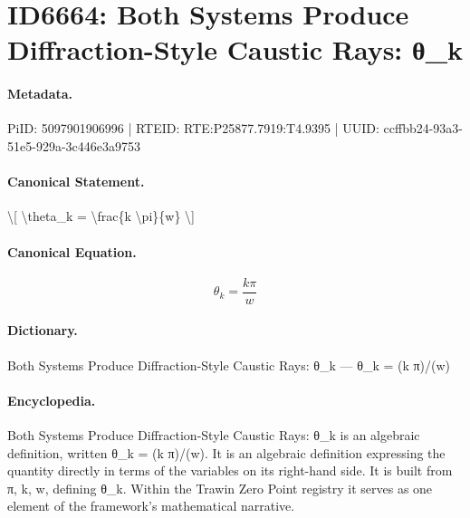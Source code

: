 \section*{ID6664: Both Systems Produce Diffraction-Style Caustic Rays: θ\_k}
\paragraph{Metadata.}
PiID: 5097901906996 | RTEID: RTE:P25877.7919:T4.9395 | UUID: ccffbb24-93a3-51e5-929a-3c446e3a9753

\paragraph{Canonical Statement.}
\textbackslash{}[ \textbackslash{}theta\_k = \textbackslash{}frac\{k \textbackslash{}pi\}\{w\} \textbackslash{}]

\paragraph{Canonical Equation.}
\[
\theta_k = \frac{k \pi}{w}
\]

\paragraph{Dictionary.}
Both Systems Produce Diffraction-Style Caustic Rays: θ\_k — θ\_k = (k π)/(w)

\paragraph{Encyclopedia.}
Both Systems Produce Diffraction-Style Caustic Rays: θ\_k is an algebraic definition, written θ\_k = (k π)/(w). It is an algebraic definition expressing the quantity directly in terms of the variables on its right-hand side. It is built from π, k, w, defining θ\_k. Within the Trawin Zero Point registry it serves as one element of the framework's mathematical narrative.
